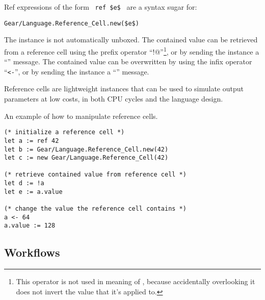 Ref expressions of the form ~\lstinline!ref $e$!~ are a syntax sugar for:
\begin{lstlisting}[deletekeywords={new}]
Gear/Language.Reference_Cell.new($e$)
\end{lstlisting}

The  instance is not automatically unboxed. The contained value can be retrieved from a reference cell using the prefix operator ``\lstinline@!@''\footnote{This operator is not used in meaning of , because accidentally overlooking it does not invert the value that it's applied to.}, or by sending the instance a ``'' message. The contained value can be overwritten by using the infix operator ``\lstinline!<-!'', or by sending the instance a ``'' message. 

Reference cells are lightweight instances that can be used to simulate output parameters at low costs, in both CPU cycles and the language design.

\example An example of how to manipulate reference cells. 
\begin{lstlisting}
(* initialize a reference cell *)
let a := ref 42
let b := Gear/Language.Reference_Cell.new(42)
let c := new Gear/Language.Reference_Cell(42)

(* retrieve contained value from reference cell *)
let d := !a
let e := a.value

(* change the value the reference cell contains *)
a <- 64
a.value := 128
\end{lstlisting}





\subsection{Workflows}
\label{sec:workflows}

